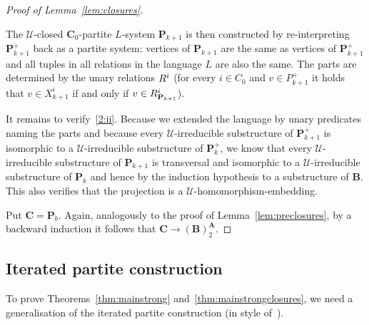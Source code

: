 \documentclass{elsarticle}
\def\str#1{\mathbf {#1}}
\def\nbrel#1#2{R\ifstrempty{#1}{}{_{#1}}\ifstrempty{#2}{}{^{#2}}}
\def\rel#1#2{\nbrel{\ifstrempty{#1}{}{\str{#1}}}{#2}}
\theoremstyle{plain}
\theoremstyle{definition}
\theoremstyle{remark}
\begin{document}
\begin{proof}[Proof of Lemma~\ref{lem:closures}]
\begin{enumerate}
The $\mathcal U$-closed $\str{C}_0$-partite $L$-system $\str{P}_{k+1}$ is then constructed by re-interpret\-ing $\str{P}^+_{k+1}$ back as a partite system: vertices of $\str{P}_{k+1}$ are the same as vertices of $\str{P}^+_{k+1}$ and all tuples in all relations in the language $L$ are also the same. The parts are determined by the unary relations $\rel{}{i}$ (for every $i\in C_0$ and $v\in P^+_{k+1}$ it holds that $v\in X^i_{k+1}$ if and only if $v\in \nbrel{\str{P}_{k+1}}{i}$).

It remains to verify~\ref{2:ii}. Because we extended the language by unary predicates naming the parts and because every $\mathcal U$-irreducible substructure of $\str{P}^+_{k+1}$ is isomorphic to a $\mathcal U$-irreducible substructure of $\str{P}^+_k$, we know that every $\mathcal U$-irreducible substructure of $\str{P}_{k+1}$ is transversal and isomorphic to a $\mathcal U$-irreducible substructure of $\str{P}_k$ and hence by the induction hypothesis to a substructure of $\str{B}$. This also verifies that the projection is a $\mathcal U$-homomorphism-embedding.
\end{enumerate}

Put $\str{C} = \str{P}_b$. 
Again, 
analogously to the proof of Lemma~\ref{lem:preclosures}, by a backward induction it follows that $\str{C}\longrightarrow (\str{B})^\str{A}_2$.
\end{proof}

\subsection{Iterated partite construction}
\label{sec:iterated}
To prove Theorems~\ref{thm:mainstrong} and~\ref{thm:mainstrongclosures}, we
need a generalisation of the iterated partite construction (in style of~\cite{Nevsetvril2007}).
\end{document}
